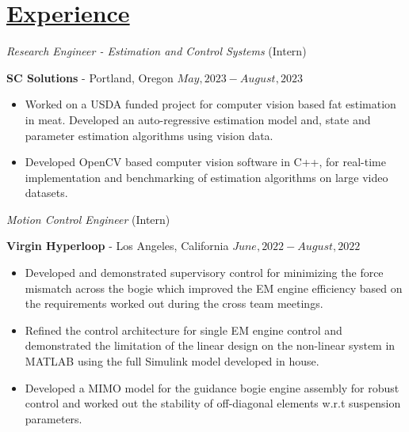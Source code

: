 \section*{\underline{Experience}}
\noindent\textit{Research Engineer  - Estimation and Control Systems} (Intern)

\textbf{SC Solutions} - Portland, Oregon \hfill $May, 2023 - August, 2023$

\begin{itemize}
    \item Worked on a USDA funded project for computer vision based fat estimation in meat. Developed an auto-regressive estimation model and, state and parameter estimation algorithms using vision data.
    \item Developed OpenCV based computer vision software in C++, for real-time implementation and benchmarking of estimation algorithms on large video datasets.
\end{itemize}

\medskip

\noindent \textit{Motion Control Engineer } (Intern)

\textbf{Virgin Hyperloop} - Los Angeles, California \hfill $June, 2022  - August, 2022$

\begin{itemize}
        \item Developed and demonstrated supervisory control for minimizing the force mismatch across the bogie which
        improved the EM engine efficiency based on the requirements worked out during the cross team meetings.
        \item Refined the control architecture for single EM engine control and demonstrated the limitation of the linear design on the non-linear system in MATLAB using the full Simulink model developed in house.
        \item Developed a MIMO model for the guidance bogie engine assembly for robust control and worked out the stability of off-diagonal
        elements w.r.t suspension parameters.
\end{itemize}


